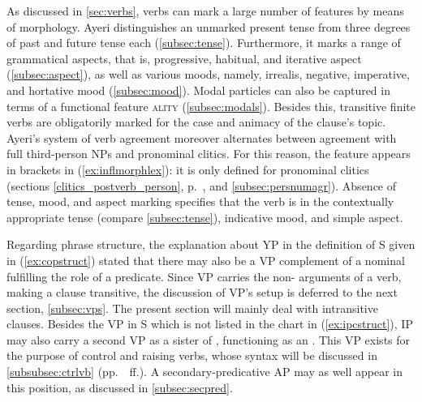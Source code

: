 As discussed in \autoref{sec:verbs}, verbs can mark a large number of features
by means of morphology. Ayeri distinguishes an unmarked present tense from
three degrees of past and future tense each (\autoref{subsec:tense}).
Furthermore, it marks a range of grammatical aspects, that is, progressive,
habitual, and iterative aspect (\autoref{subsec:aspect}), as well as various
moods, namely, irrealis, negative, imperative, and hortative mood
(\autoref{subsec:mood}). Modal particles can also be captured in terms of a
functional feature \Mod\textsc{ality} (\autoref{subsec:modals}). Besides this,
transitive finite verbs are obligatorily marked for the case and animacy of the
clause's topic. Ayeri's system of verb agreement moreover alternates between
agreement with full third-person NPs and pronominal clitics. For this reason,
the feature \ups{\Subj{} \Pred} appears in brackets in (\ref{ex:inflmorphlex}):
it is only defined for pronominal clitics (sections
\ref{clitics_postverb_person}, p.~\pageref{clitics_postverb_person}, and
\ref{subsec:persnumagr}). Absence of tense, mood, and aspect marking specifies
that the verb is in the contextually appropriate tense (compare
\autoref{subsec:tense}), indicative mood, and simple aspect.

Regarding phrase structure, the explanation about YP in the definition of S
given in (\ref{ex:copstruct}) stated that there may also be a VP complement of
a nominal fulfilling the role of a predicate. Since VP carries the non-\Subj{}
arguments of a verb, making a clause transitive, the discussion of VP's setup
is deferred to the next section, \ref{subsec:vps}. The present section will
mainly deal with intransitive clauses. Besides the VP in S which is not listed
in the chart in (\ref{ex:ipcstruct}), IP may also carry a second VP as a sister
of , functioning as an \XCompl{}. This VP exists for the purpose of
control and raising verbs, whose syntax will be discussed in
\autoref{subsubsec:ctrlvb} (pp.~\pageref{subsubsec:ctrlvb}~ff.). A
secondary-predicative AP may as well appear in this position, as discussed in
\autoref{subsec:secpred}.

